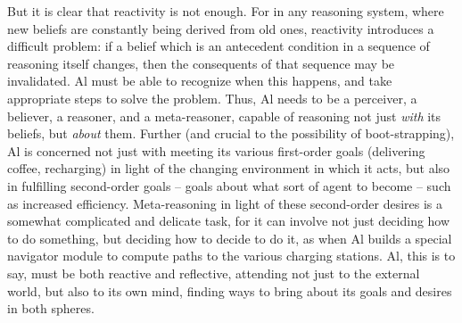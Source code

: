 \documentclass[]{llncs}
\begin{document}
But it is clear that reactivity is not enough.  For in any reasoning
system, where new beliefs are constantly being derived from old ones,
reactivity introduces a difficult problem: if a belief which is an
antecedent condition in a sequence of reasoning itself changes, then
the consequents of that sequence may be invalidated.  Al must be able
to recognize when this happens, and take appropriate steps to solve
the problem.  Thus, Al needs to be a perceiver, a believer, a
reasoner, and a meta-reasoner, capable of reasoning not just {\em
with} its beliefs, but {\em about} them.  Further (and crucial to the
possibility of boot-strapping), Al is concerned not just with meeting
its various first-order goals (delivering coffee, recharging) in light
of the changing environment in which it acts, but also in fulfilling
second-order goals \cite{Frankfurt:Importance} -- goals about what
sort of agent to become -- such as increased efficiency.
Meta-reasoning in light of these second-order desires is a somewhat
complicated and delicate task, for it can involve not just deciding
how to do something, but deciding how to decide to do it, as when Al
builds a special navigator module to compute paths to the various
charging stations.  Al, this is to say, must be both reactive and
reflective, attending not just to the external world, but also to its
own mind, finding ways to bring about its goals and desires in both
spheres.
\end{document}
